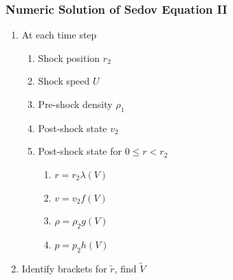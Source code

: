 %
\begin{frame}\frametitle{Numeric Solution of Sedov Equation II}
\begin{enumerate}
\setcounter{enumi}{\value{algorithmCounter}}
	\item At each time step
	\begin{enumerate}
		\item Shock position $r_{2}$
		\item Shock speed $U$
		\item Pre-shock density $\rho_{1}$
		\item Post-shock state $v_{2}$
		\item Post-shock state for $0 \le r < r_{2}$
		\begin{enumerate}
			\item $r=r_{2} \lambda(V)$
			\item $v =v_{2} f(V)$
			\item $\rho = \rho_{2} g(V)$
			\item $p = p_{2} h(V)$
		\end{enumerate}
	\end{enumerate}
		\item Identify brackets for $\tilde{r}$, find $\tilde{V}$
\end{enumerate}
\end{frame}
%
